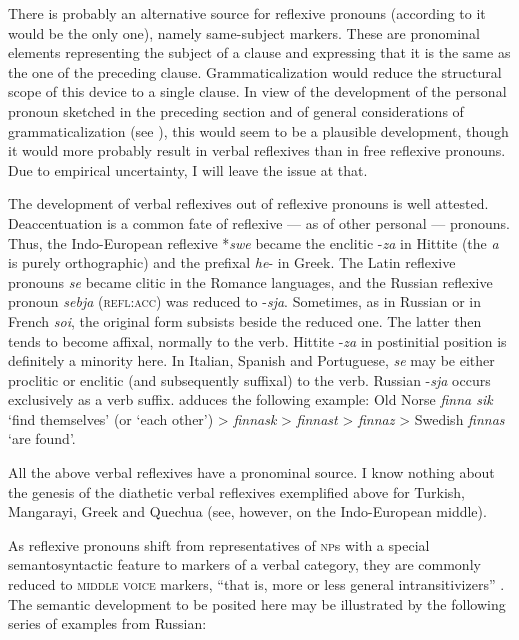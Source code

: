 There is probably an alternative source for reflexive pronouns (according to \citet[248--266]{Faltz1977} it would be the only one), namely same-subject markers. These are pronominal elements representing the subject of a clause and expressing that it is the same as the one of the preceding clause. Grammaticalization would reduce the structural scope of this device to a single clause. In view of the development of the personal pronoun sketched in the preceding section and of general considerations of grammaticalization (see ), this would seem to be a plausible development, though it would more probably result in verbal reflexives than in free reflexive pronouns. Due to empirical uncertainty, I will leave the issue at that.

The development of verbal reflexives out of reflexive pronouns is well attested. Deaccentuation is a common fate of reflexive — as of other personal — pronouns. Thus, the Indo-European reflexive *\textit{swe} became the enclitic -\textit{za} in Hittite (the \textit{a} is purely orthographic) and the prefixal \textit{he}{}- in Greek. The Latin reflexive pronouns \textit{se} became clitic in the Romance languages, and the Russian reflexive pronoun \textit{sebja} (\textsc{refl:acc}) was reduced to -\textit{sja}. Sometimes, as in Russian or in French \textit{soi}, the original form subsists beside the reduced one. The latter then tends to become affixal, normally to the verb. Hittite -\textit{za} in postinitial position is definitely a minority here. In Italian, Spanish and Portuguese, \textit{se} may be either proclitic or enclitic (and subsequently suffixal) to the verb. Russian -\textit{sja} occurs exclusively as a verb suffix. \citet[377]{Jespersen1922} adduces the following example: Old Norse \textit{finna sik} ‘find themselves’ (or ‘each other’) {\textgreater} \textit{finnask} {\textgreater} \textit{finnast} {\textgreater} \textit{finnaz} {\textgreater} Swedish \textit{finnas} ‘are found’.

All the above verbal reflexives have a pronominal source. I know nothing about the genesis of the diathetic verbal reflexives exemplified above for Turkish, Mangarayi, Greek and Quechua (see, however, \citealt[305--309]{Szemerényi1970} on the Indo-European middle).

As reflexive pronouns shift from representatives of \textsc{np}s with a special semantosyntactic feature to markers of a verbal category, they are commonly reduced to \textsc{middle voice} markers, “that is, more or less general intransitivizers” \citep[268f]{Faltz1977}. The semantic development to be posited here may be illustrated by the following series of examples from Russian:

